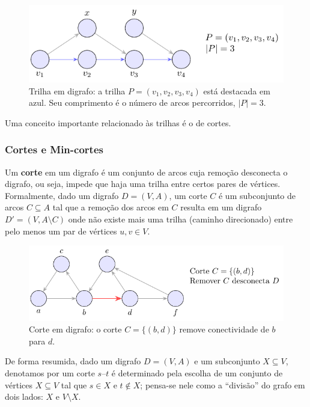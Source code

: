 \begin{figure}[H]
	\centering
	\includegraphics[width=0.9\linewidth]{figures/fig_trilha.pdf}

	\caption{Trilha em digrafo: a trilha $P=(v_1,v_2,v_3,v_4)$ está destacada em azul. Seu comprimento é o número de arcos percorridos, $|P|=3$.}
	\label{fig:trilha}\end{figure}



Uma conceito importante relacionado às trilhas é o de cortes.

\subsubsection{Cortes e Min-cortes}

Um \textbf{corte} em um digrafo é um conjunto de arcos cuja remoção desconecta o digrafo, ou seja, impede que haja uma trilha entre certos pares de vértices. Formalmente, dado um digrafo \(D = (V, A)\), um corte \(C\) é um subconjunto de arcos \(C \subseteq A\) tal que a remoção dos arcos em \(C\) resulta em um digrafo \(D' = (V, A \setminus C)\) onde não existe mais uma trilha (caminho direcionado) entre pelo menos um par de vértices \(u, v \in V\).


\begin{figure}[H]
	\centering
	\includegraphics[width=0.9\linewidth]{figures/fig_corte.pdf}

	\caption{Corte em digrafo: o corte $C=\{(b,d)\}$ remove conectividade de $b$ para $d$.}
	\label{fig:corte}
\end{figure}



De forma resumida, dado um digrafo \(D=(V,A)\) e um subconjunto \(X\subseteq V\), denotamos por um corte \(s\text{--}t\) é determinado pela escolha de um conjunto de vértices \(X\subseteq V\) tal que \(s\in X\) e \(t\notin X\); pensa-se nele como a “divisão” do grafo em dois lados: \(X\) e \(V\setminus X\).

